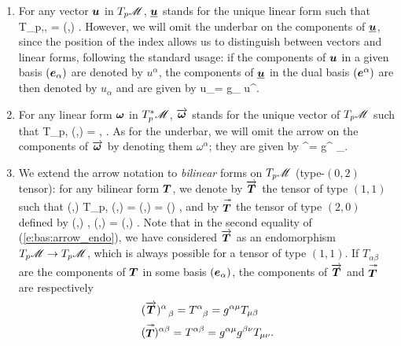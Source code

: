 \begin{enumerate}
\item For any vector $\bm{u}$ in $T_p\mathscr{M}$, $\underline{\bm{u}}$ stands for
the unique linear form such that
\be \label{e:bas:underbar}
    \forall {} \in T_p\M,\quad \langle {}, 
        \rangle = (,) .
\ee
However, we will omit the underbar on the components
of $\underline{\bm{u}}$, since
the position of the index allows us to distinguish between vectors
and  linear forms, following the standard usage:
if the components of
$\bm{u}$ in a given basis $(\bm{e}_\alpha)$ are denoted by $u^\alpha$,
the components of $\underline{\bm{u}}$ in the dual basis $(\bm{e}^\alpha)$
are then denoted by $u_\alpha$ and are given by
\be \label{e:bas:u_dual}
  u_\alpha = g_{\alpha\mu} u^\mu .
\ee
\item For any linear form $\bm{\omega}$ in ${T_p^*\mathscr{M}}$, $\overrightarrow{\bm{\bm{\omega}}}$
stands for the unique vector of $T_p\mathscr{M}$ such that
\be \label{e:bas:arrow_form}
    \forall {} \in T_p\M,\quad
        (\vw{\w{\omega}},) =
        \langle \w{\omega},  \rangle .
\ee
As for the underbar, we will omit the arrow on the components
of $\overrightarrow{\bm{\bm{\omega}}}$ by denoting them $\omega^\alpha$; they are given by
\be \label{e:bas:arrow_form_comp}
  \omega^\alpha = g^{\alpha\mu} \omega_\mu .
\ee
\item We extend the arrow notation to {\em bilinear} forms on $T_p\mathscr{M}$ (type-$(0,2)$ tensor):
for any bilinear form $\bm{T}$,
we denote by $\overrightarrow{\bm{T}}$ the tensor of type $(1,1)$ such that
\be \label{e:bas:arrow_endo}
    \forall (,) \in T_p\M{}, \quad
    (,) = (,) =  \cdot {}() ,
\ee
and by $\stackrel{\twoheadrightarrow}{\bm{T}}$ the tensor of type $(2,0)$ defined by
\be \label{e:bas:arrow_double}
    \forall (,) , \quad
    (,) = (,) .
\ee
Note that in the second equality of (\ref{e:bas:arrow_endo}), we have considered $\overrightarrow{\bm{T}}$
as an endomorphism ${T_p\mathscr{M}}\rightarrow {T_p\mathscr{M}}$, which is always possible for a tensor of
type $(1,1)$.
If $T_{\alpha\beta}$ are the components of $\bm{T}$
in some basis $(\bm{e}_\alpha)$, the components of $\overrightarrow{\bm{T}}$ and $\stackrel{\twoheadrightarrow}{\bm{T}}$ are respectively
\begin{subequations}
\begin{align}
  & (\overrightarrow{\bm{T}})^\alpha_{\ \  \beta} = T^\alpha_{\ \  \beta} = g^{\alpha\mu} T_{\mu\beta}
    \label{e:bas:arrow_endo_index}\\
  & (\stackrel{\twoheadrightarrow}{\bm{T}})^{\alpha\beta} = T^{\alpha\beta} = g^{\alpha\mu} g^{\beta\nu} T_{\mu\nu} .
    \label{e:bas:arrow_double_index}
\end{align}
\end{subequations}
\end{enumerate}

